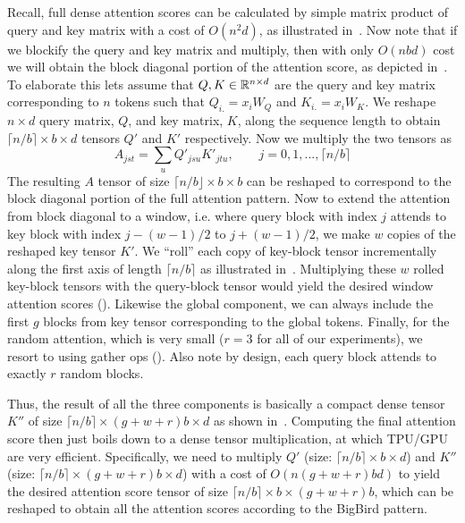 Recall, full dense attention scores can be calculated by simple matrix product of query and key matrix with a cost of $O(n^2d)$, as illustrated in~.
Now note that if we blockify the query and key matrix and multiply, then with only $O(nbd)$ cost we will obtain the block diagonal portion of the attention score, as depicted in~.
To elaborate this lets assume that $Q, K \in \mathbb{R}^{n \times d}$ are the query and key matrix corresponding to $n$ tokens such that $Q_{i.} = x_i W_Q$ and $K_{i.} = x_i W_K$.
We reshape $n \times d$ query matrix, $Q$, and key matrix, $K$, along the sequence length to obtain $\lceil n/b \rceil \times b \times d$ tensors $Q'$ and $K'$ respectively.
Now we multiply the two tensors as
\begin{equation}
    A_{jst} = \sum_{u} Q'_{jsu} K'_{jtu}, \qquad j=0,1,...,\lceil n/b \rceil 
\end{equation}
The resulting $A$ tensor of size $\lceil n/b \rfloor \times b \times b $ can be reshaped to correspond to the block diagonal portion of the full attention pattern.
Now to extend the attention from block diagonal to a window, i.e. where query block with index $j$ attends to key block with index $j - (w-1)/2$ to $j + (w-1)/2$, we make $w$ copies of the reshaped key tensor $K'$.
We ``roll'' each copy of key-block tensor incrementally along the first axis of length $\lceil n/b \rceil$ as illustrated in~.
Multiplying these $w$ rolled key-block tensors with the query-block tensor would yield the desired window attention scores ().
Likewise the global component, we can always include the first $g$ blocks from key tensor corresponding to the global tokens.
Finally, for the random attention, which is very small ($r=3$ for all of our experiments), we resort to using gather ops (). 
Also note by design, each query block attends to exactly $r$ random blocks.

Thus, the result of all the three components is basically a compact dense tensor $K''$ of size $\lceil n/b \rceil \times (g+w+r)b \times d$ as shown in~.
Computing the final attention score then just boils down to a dense tensor multiplication, at which TPU/GPU are very efficient.
Specifically, we need to multiply $Q'$ (size: $\lceil n/b \rceil \times b \times d$) and $K''$ (size: $\lceil n/b \rceil \times (g+w+r)b \times d$) with a cost of $O(n(g+w+r)bd)$ to yield the desired attention score tensor of size $\lceil n/b \rceil \times b \times (g+w+r)b $, which can be reshaped to obtain all the attention scores according to the BigBird pattern.

